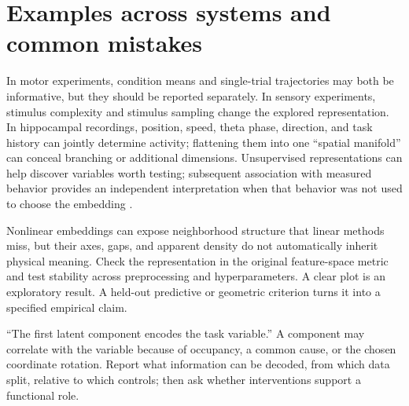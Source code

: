 \section{Examples across systems and common mistakes}
In motor experiments, condition means and single-trial trajectories may both be informative, but they should be reported separately. In sensory experiments, stimulus complexity and stimulus sampling change the explored representation. In hippocampal recordings, position, speed, theta phase, direction, and task history can jointly determine activity; flattening them into one ``spatial manifold'' can conceal branching or additional dimensions. Unsupervised representations can help discover variables worth testing; subsequent association with measured behavior provides an independent interpretation when that behavior was not used to choose the embedding \citep{app_rubin2019}.

Nonlinear embeddings can expose neighborhood structure that linear methods miss, but their axes, gaps, and apparent density do not automatically inherit physical meaning. Check the representation in the original feature-space metric and test stability across preprocessing and hyperparameters. A clear plot is an exploratory result. A held-out predictive or geometric criterion turns it into a specified empirical claim.

\begin{misconception}
``The first latent component encodes the task variable.'' A component may correlate with the variable because of occupancy, a common cause, or the chosen coordinate rotation. Report what information can be decoded, from which data split, relative to which controls; then ask whether interventions support a functional role.
\end{misconception}

